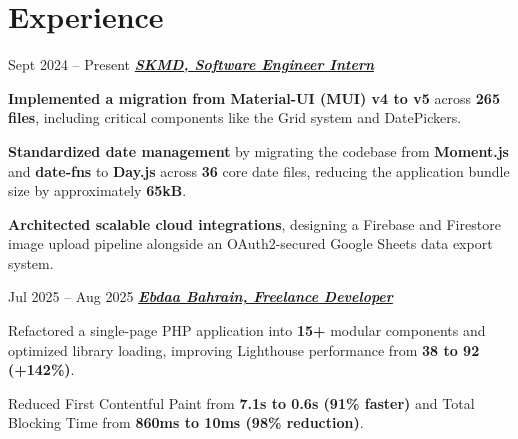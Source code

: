 \section{Experience}

    \begin{twocolentry}{Sept 2024 -- Present}
    \textbf{\href{https://www.skmd.app}{\textit{\textcolor{linkColor}{SKMD, Software Engineer Intern\hspace{4pt}}}}}
    \end{twocolentry}
    \vspace{0.10 cm}
    \begin{onecolentry}
        \begin{highlights}
            \item \textbf{Implemented a migration from Material-UI (MUI) v4 to v5} across \textbf{265 files}, including critical components like the Grid system and DatePickers.
            \item \textbf{Standardized date management} by migrating the codebase from \textbf{Moment.js} and \textbf{date-fns} to \textbf{Day.js} across \textbf{36} core date files, reducing the application bundle size by approximately \textbf{65kB}.
            \item \textbf{Architected scalable cloud integrations}, designing a Firebase and Firestore image upload pipeline alongside an OAuth2-secured Google Sheets data export system.

        \end{highlights}
    \end{onecolentry}
    \vspace{0.25 cm}


    \begin{twocolentry}{Jul 2025 -- Aug 2025}
    \textbf{\href{https://www.ebdaabahrain.com}{\textit{\textcolor{linkColor}{Ebdaa Bahrain, Freelance Developer\hspace{4pt}}}}}
    \end{twocolentry}
    \vspace{0.10 cm}
    \begin{onecolentry}
        \begin{highlights}
            \item Refactored a single-page PHP application into \textbf{15+} modular components and optimized library loading, improving Lighthouse performance from \textbf{38 to 92 (+142\%)}.
            \item Reduced First Contentful Paint from \textbf{7.1s to 0.6s (91\% faster)} and Total Blocking Time from \textbf{860ms to 10ms (98\% reduction)}.
        \end{highlights}
    \end{onecolentry}
